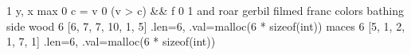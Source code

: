 \expandafter\def\csname cpp:swap\endcsname{1}
\expandafter\def\csname cpp:PARAM(x,y)\endcsname{y, x}
\expandafter\def\csname cpp:comp\endcsname{max}
\expandafter\def\csname cpp:INIT\endcsname{0}
\expandafter\def\csname cpp:PROCESS(c,v)\endcsname{c = v}
\expandafter\def\csname cpp:NOT\endcsname{0}
\expandafter\def\csname cpp:COND(f,c,v)\endcsname{(v > c) && f}
\expandafter\def\csname cpp:FALSE\endcsname{0}
\expandafter\def\csname cpp:TRUE\endcsname{1}
\expandafter\def\csname cpp:join\endcsname{and}
\expandafter\def\csname cpp:FORALLIN\endcsname{roar}
\expandafter\def\csname cpp:A\endcsname{gerbil}
\expandafter\def\csname cpp:B\endcsname{filmed}
\expandafter\def\csname cpp:C\endcsname{franc}
\expandafter\def\csname cpp:I\endcsname{colors}
\expandafter\def\csname cpp:J\endcsname{bathing}
\expandafter\def\csname cpp:F\endcsname{side}
\expandafter\def\csname cpp:U\endcsname{wood}
\expandafter\def\csname cpp:TABU_LEN\endcsname{6}
\expandafter\def\csname cpp:TABU_VAL\endcsname{[6, 7, 7, 10, 1, 5]}
\expandafter\def\csname cpp:TABU\endcsname{{.len=6, .val=malloc(6 * sizeof(int))}}
\expandafter\def\csname cpp:V\endcsname{maces}
\expandafter\def\csname cpp:TABV_LEN\endcsname{6}
\expandafter\def\csname cpp:TABV_VAL\endcsname{[5, 1, 2, 1, 7, 1]}
\expandafter\def\csname cpp:TABV\endcsname{{.len=6, .val=malloc(6 * sizeof(int))}}

\def\C#1{\csname cpp:#1\endcsname}


